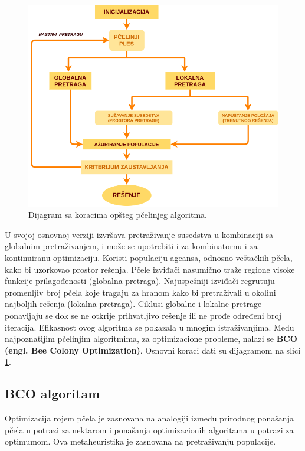 \documentclass[a4paper]{article}
\begin{document}
{\begin{figure}[h!]
\begin{center}
\includegraphics[scale=0.29]{dijagram.png}
\end{center}
\caption{Dijagram sa koracima opšteg pčelinjeg algoritma.}
\label{fig:dij}
\end{figure}
U svojoj osnovnoj verziji izvršava pretraživanje susedstva u kombinaciji sa globalnim pretraživanjem, i može se upotrebiti i za kombinatornu i za kontinuiranu optimizaciju. Koristi populaciju ageansa, odnosno veštačkih pčela, kako bi uzorkovao prostor rešenja\cite{bcoalg}. Pčele izviđači nasumično traže regione visoke funkcije prilagođenosti (globalna pretraga). Najuspešniji izviđači regrutuju promenljiv broj pčela koje tragaju za hranom kako bi pretraživali u okolini najboljih rešenja (lokalna pretraga).
Ciklusi globalne i lokalne pretrage ponavljaju se dok se ne otkrije prihvatljivo rešenje ili ne prođe određeni broj iteracija. Efikasnost ovog algoritma se pokazala u mnogim istraživanjima. 
Među najpoznatijim pčelinjim algoritmima, za optimizacione probleme, nalazi se \textbf{BCO (engl. Bee Colony Optimization)}.
Osnovni koraci dati su dijagramom na slici \ref{fig:dij}.

\subsection{BCO algoritam}
\label{subsec:bco}
Optimizacija rojem pčela je zasnovana na analogiji između prirodnog ponašanja pčela u potrazi za nektarom i ponašanja optimizacionih algoritama u potrazi za optimumom\cite{bcoalg}. Ova metaheuristika je zasnovana na pretraživanju populacije. 

}
\end{document}
